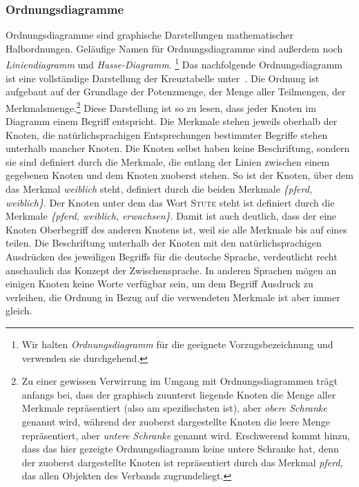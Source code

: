 \documentclass[pagesize,DIV=calc,12pt,final]{scrreprt}
\begin{document}
\subsubsection{Ordnungsdiagramme}

Ordnungsdiagramme sind graphische Darstellungen mathematischer Halbordnungen. 
Geläufige Namen für Ordnungsdiagramme sind außerdem noch \textit{Liniendiagramm} und \textit{Hasse-Diagramm}.
\footnote{Wir halten \textit{Ordnungsdiagramm} für die geeignete Vorzugsbezeichnung und verwenden sie durchgehend.}
Das nachfolgende Ordnungsdiagramm ist eine vollständige Darstellung der Kreuztabelle unter\emph{~}.
Die Ordnung ist aufgebaut auf der Grundlage der Potenzmenge, der Menge aller Teilmengen, der Merkmalsmenge.\footnote{Zu einer gewissen Verwirrung im Umgang mit Ordnungsdiagrammen trägt anfangs bei, dass der graphisch zuunterst liegende Knoten die Menge aller Merkmale repräsentiert (also am spezifischsten ist), aber \textit{obere Schranke} genannt wird, während der zuoberst dargestellte Knoten die leere Menge repräsentiert, aber \textit{untere Schranke} genannt wird. 
Erschwerend kommt hinzu, dass das hier gezeigte Ordnungsdiagramm keine untere Schranke hat, denn der zuoberst dargestellte Knoten ist repräsentiert durch das Merkmal \textit{pferd}, das allen Objekten des Verbands zugrundeliegt.}
Diese Darstellung ist so zu lesen, dass jeder Knoten im Diagramm einem Begriff entspricht.
Die Merkmale stehen jeweils oberhalb der Knoten, die natürlichsprachigen Entsprechungen bestimmter Begriffe stehen unterhalb mancher Knoten.
Die Knoten selbst haben keine Beschriftung, sondern sie sind definiert durch die Merkmale, die entlang der Linien zwischen einem gegebenen Knoten und dem Knoten zuoberst stehen.
So ist der Knoten, über dem das Merkmal \textit{weiblich} steht, definiert durch die beiden Merkmale \textit{\{pferd, weiblich\}}.
Der Knoten unter dem das Wort \textsc{Stute} steht ist definiert durch die Merkmale \textit{\{pferd, weiblich, erwachsen\}}.
Damit ist auch deutlich, dass der eine Knoten Oberbegriff des anderen Knotens ist, weil sie alle Merkmale bis auf eines teilen.
Die Beschriftung unterhalb der Knoten mit den natürlichsprachigen Ausdrücken des jeweiligen Begriffs für die deutsche Sprache, verdeutlicht recht anschaulich das Konzept der Zwischensprache.
In anderen Sprachen mögen an einigen Knoten keine Worte verfügbar sein, um dem Begriff Ausdruck zu verleihen, die Ordnung in Bezug auf die verwendeten Merkmale ist aber immer gleich.
\end{document}
